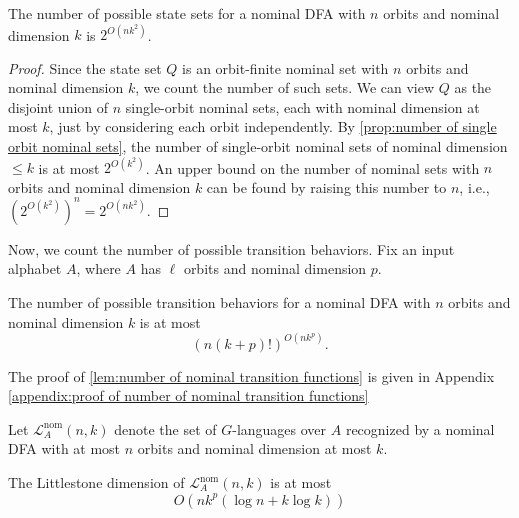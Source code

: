 \documentclass[runningheads]{llncs}
\newcommand{\mc}{\mathcal}
\begin{document}
\begin{lemma} \label{lem:number of nominal state sets}
    The number of possible state sets for a nominal DFA with $n$ orbits and nominal dimension $k$ is $2^{O(nk^2)}$.
\end{lemma}

\begin{proof}
    Since the state set $Q$ is an orbit-finite nominal set with $n$ orbits and nominal dimension $k$, we count the number of such sets. 
    We can view $Q$ as the disjoint union of $n$ single-orbit nominal sets, each with nominal dimension at most $k$, just by considering each orbit independently.
    By \autoref{prop:number of single orbit nominal sets}, the number of single-orbit nominal sets of nominal dimension $\leq k$ is at most $2^{O(k^2)}$.
    An upper bound on the number of nominal sets with $n$ orbits and nominal dimension $k$ can be found by raising this number to $n$, i.e., $\left(2^{O(k^2)}\right)^n = 2^{O(nk^2)}$.
\end{proof}


Now, we count the number of possible transition behaviors.
Fix an input alphabet $A$, where $A$ has $\ell$ orbits and nominal dimension $p$.


\begin{lemma} \label{lem:number of nominal transition functions}
    The number of possible transition behaviors for a nominal DFA with $n$ orbits and nominal dimension $k$ is at most 
    \[
    \left(n (k+p)!\right)^{O\left(nk^{p}\right)}.
    \]
\end{lemma}

The proof of \autoref{lem:number of nominal transition functions} is given in Appendix \ref{appendix:proof of number of nominal transition functions}

Let $\mc L^{\text{nom}}_A(n,k)$ denote the set of $G$-languages over $A$ recognized by a nominal DFA with at most $n$ orbits and nominal dimension at most $k$.

\begin{proposition} \label{prop:littlestone dimension of nominal automata}
    The Littlestone dimension of $\mc L^{\text{nom}}_A(n,k)$ is at most 
    \[
    O\left(nk^{p} \left(\log n + k \log k \right)\right)
    \]
\end{proposition}
\end{document}
